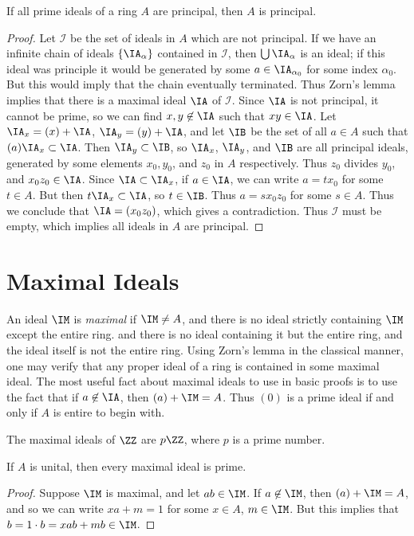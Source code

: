 \begin{theorem}
    If all prime ideals of a ring $A$ are principal, then $A$ is principal.
\end{theorem}
\begin{proof}
    Let $\mathcal{I}$ be the set of ideals in $A$ which are not principal. If we have an infinite chain of ideals $\{ \IA_\alpha \}$ contained in $\mathcal{I}$, then $\bigcup \IA_\alpha$ is an ideal; if this ideal was principle it would be generated by some $a \in \IA_{\alpha_0}$ for some index $\alpha_0$. But this would imply that the chain eventually terminated. Thus Zorn's lemma implies that there is a maximal ideal $\IA$ of $\mathcal{I}$. Since $\IA$ is not principal, it cannot be prime, so we can find $x,y \not \in \IA$ such that $xy \in \IA$. Let $\IA_x = (x) + \IA$, $\IA_y = (y) + \IA$, and let $\IB$ be the set of all $a \in A$ such that $(a) \IA_x \subset \IA$. Then $\IA_y \subset \IB$, so $\IA_x$, $\IA_y$, and $\IB$ are all principal ideals, generated by some elements $x_0,y_0$, and $z_0$ in $A$ respectively. Thus $z_0$ divides $y_0$, and $x_0z_0 \in \IA$. Since $\IA \subset \IA_x$, if $a \in \IA$, we can write $a = tx_0$ for some $t \in A$. But then $t\IA_x \subset \IA$, so $t \in \IB$. Thus $a = sx_0z_0$ for some $s \in A$. Thus we conclude that $\IA = (x_0z_0)$, which gives a contradiction. Thus $\mathcal{I}$ must be empty, which implies all ideals in $A$ are principal.
\end{proof}

\section{Maximal Ideals}

An ideal $\IM$ is \emph{maximal} if $\IM \neq A$, and there is no ideal strictly containing $\IM$ except the entire ring. and there is no ideal containing it but the entire ring, and the ideal itself is not the entire ring. Using Zorn's lemma in the classical manner, one may verify that any proper ideal of a ring is contained in some maximal ideal. The most useful fact about maximal ideals to use in basic proofs is to use the fact that if $a \not \in \IA$, then $(a) + \IM = A$. Thus $(0)$ is a prime ideal if and only if $A$ is entire to begin with.

\begin{example}
    The maximal ideals of $\ZZ$ are $p \ZZ$, where $p$ is a prime number.
\end{example}

\begin{theorem}
    If $A$ is unital, then every maximal ideal is prime.
\end{theorem}
\begin{proof}
    Suppose $\IM$ is maximal, and let $ab \in \IM$. If $a \not \in \IM$, then $(a) + \IM = A$, and so we can write $xa + m = 1$ for some $x \in A$, $m \in \IM$. But this implies that $b = 1 \cdot b = xab + mb \in \IM$.
\end{proof}

